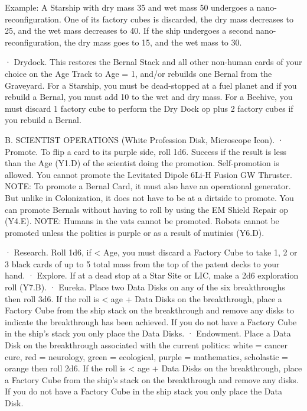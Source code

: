 \documentclass[a4paper]{book}
\begin{document}
Example: A Starship with dry mass 35 and wet mass 50 undergoes a nano-reconfiguration. One of its factory cubes is discarded, the dry mass decreases to 25, and the wet mass decreases to 40. If the ship undergoes a second nano-reconfiguration, the dry mass goes to 15, and the wet mass to 30.

·       Drydock. This restores the Bernal Stack and all other non-human cards of your choice on the Age Track to Age = 1, and/or rebuilds one Bernal from the Graveyard. For a Starship, you must be dead-stopped at a fuel planet and if you rebuild a Bernal, you must add 10 to the wet and dry mass.  For a Beehive, you must discard 1 factory cube to perform the Dry Dock op plus 2 factory cubes if you rebuild a Bernal. 
 
B. SCIENTIST OPERATIONS (White Profession Disk, Microscope Icon).
·       Promote. To flip a card to its purple side, roll 1d6. Success if the result is less than the Age (Y1.D) of the scientist doing the promotion. Self-promotion is allowed. You cannot promote the Levitated Dipole 6Li-H Fusion GW Thruster.
NOTE: To promote a Bernal Card, it must also have an operational generator. But unlike in Colonization, it does not have to be at a dirtside to promote. You can promote Bernals without having to roll by using the EM Shield Repair op (Y4.E).
NOTE: Humans in the vats cannot be promoted. Robots cannot be promoted unless the politics is purple or as a result of mutinies (Y6.D).

·       Research. Roll 1d6, if < Age, you must discard a Factory Cube to take 1, 2 or 3 black cards of up to 5 total mass from the top of the patent decks to your hand.
·       Explore. If at a dead stop at a Star Site or LIC, make a 2d6 exploration roll (Y7.B).
·       Eureka. Place two Data Disks on any of the six breakthroughs then roll 3d6. If the roll is < age + Data Disks on the breakthrough, place a Factory Cube from the ship stack on the breakthrough and remove any disks to indicate the breakthrough has been achieved. If you do not have a Factory Cube in the ship’s stack you only place the Data Disks.
·       Endowment. Place a Data Disk on the breakthrough associated with the current politics: white = cancer cure, red = neurology, green = ecological, purple = mathematics, scholastic = orange then roll 2d6. If the roll is < age + Data Disks on the breakthrough, place a Factory Cube from the ship’s stack on the breakthrough and remove any disks. If you do not have a Factory Cube in the ship stack you only place the Data Disk.
\end{document}
